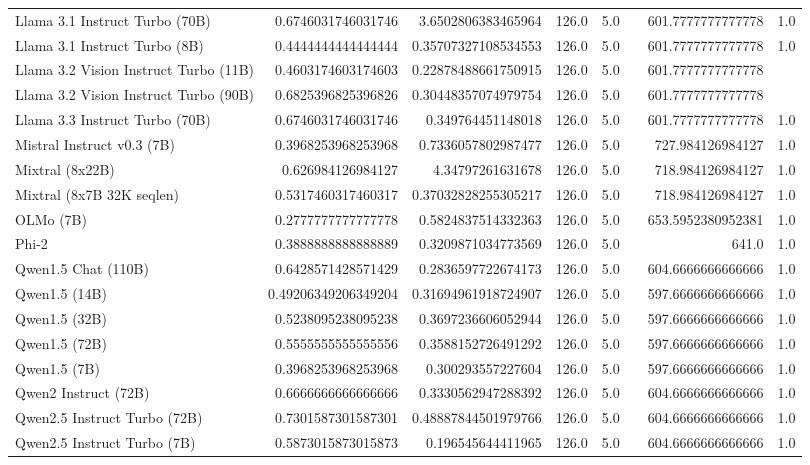 \begin{table}[htp]
{\begin{tabular}{lrrrrrrr}
Llama 3.1 Instruct Turbo (70B) & 0.6746031746031746 & 3.6502806383465964 & 126.0 & 5.0 &  & 601.7777777777778 & 1.0 \\
Llama 3.1 Instruct Turbo (8B) & 0.4444444444444444 & 0.35707327108534553 & 126.0 & 5.0 &  & 601.7777777777778 & 1.0 \\
Llama 3.2 Vision Instruct Turbo (11B) & 0.4603174603174603 & 0.22878488661750915 & 126.0 & 5.0 &  & 601.7777777777778 &  \\
Llama 3.2 Vision Instruct Turbo (90B) & 0.6825396825396826 & 0.30448357074979754 & 126.0 & 5.0 &  & 601.7777777777778 &  \\
Llama 3.3 Instruct Turbo (70B) & 0.6746031746031746 & 0.349764451148018 & 126.0 & 5.0 &  & 601.7777777777778 & 1.0 \\
Mistral Instruct v0.3 (7B) & 0.3968253968253968 & 0.7336057802987477 & 126.0 & 5.0 &  & 727.984126984127 & 1.0 \\
Mixtral (8x22B) & 0.626984126984127 & 4.34797261631678 & 126.0 & 5.0 &  & 718.984126984127 & 1.0 \\
Mixtral (8x7B 32K seqlen) & 0.5317460317460317 & 0.37032828255305217 & 126.0 & 5.0 &  & 718.984126984127 & 1.0 \\
OLMo (7B) & 0.2777777777777778 & 0.5824837514332363 & 126.0 & 5.0 &  & 653.5952380952381 & 1.0 \\
Phi-2 & 0.3888888888888889 & 0.3209871034773569 & 126.0 & 5.0 &  & 641.0 & 1.0 \\
Qwen1.5 Chat (110B) & 0.6428571428571429 & 0.2836597722674173 & 126.0 & 5.0 &  & 604.6666666666666 & 1.0 \\
Qwen1.5 (14B) & 0.49206349206349204 & 0.31694961918724907 & 126.0 & 5.0 &  & 597.6666666666666 & 1.0 \\
Qwen1.5 (32B) & 0.5238095238095238 & 0.3697236606052944 & 126.0 & 5.0 &  & 597.6666666666666 & 1.0 \\
Qwen1.5 (72B) & 0.5555555555555556 & 0.3588152726491292 & 126.0 & 5.0 &  & 597.6666666666666 & 1.0 \\
Qwen1.5 (7B) & 0.3968253968253968 & 0.300293557227604 & 126.0 & 5.0 &  & 597.6666666666666 & 1.0 \\
Qwen2 Instruct (72B) & 0.6666666666666666 & 0.3330562947288392 & 126.0 & 5.0 &  & 604.6666666666666 & 1.0 \\
Qwen2.5 Instruct Turbo (72B) & 0.7301587301587301 & 0.48887844501979766 & 126.0 & 5.0 &  & 604.6666666666666 & 1.0 \\
Qwen2.5 Instruct Turbo (7B) & 0.5873015873015873 & 0.196545644411965 & 126.0 & 5.0 &  & 604.6666666666666 & 1.0 \\

\end{tabular}}
\end{table}
